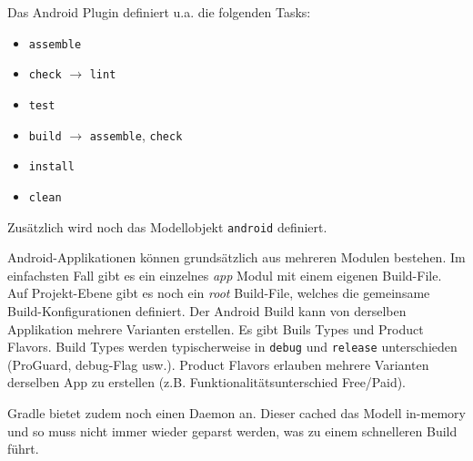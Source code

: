 Das Android Plugin definiert u.a. die folgenden Tasks:
\begin{itemize}
	\item \texttt{assemble}
	\item \texttt{check} $\rightarrow$ \texttt{lint}
	\item \texttt{test}
	\item \texttt{build} $\rightarrow$ \texttt{assemble}, \texttt{check}
	\item \texttt{install}
	\item \texttt{clean}
\end{itemize}
Zusätzlich wird noch das Modellobjekt \texttt{android} definiert.

Android-Applikationen können grundsätzlich aus mehreren Modulen bestehen. Im einfachsten Fall gibt es ein einzelnes \emph{app} Modul mit einem eigenen Build-File. Auf Projekt-Ebene gibt es noch ein \emph{root} Build-File, welches die gemeinsame Build-Konfigurationen definiert. Der Android Build kann von derselben Applikation mehrere Varianten erstellen. Es gibt Buils Types und Product Flavors. Build Types werden typischerweise in \texttt{debug} und \texttt{release} unterschieden (ProGuard, debug-Flag usw.). Product Flavors erlauben mehrere Varianten derselben App zu erstellen (z.B. Funktionalitätsunterschied Free/Paid).

Gradle bietet zudem noch einen Daemon an. Dieser cached das Modell in-memory und so muss nicht immer wieder geparst werden, was zu einem schnelleren Build führt.